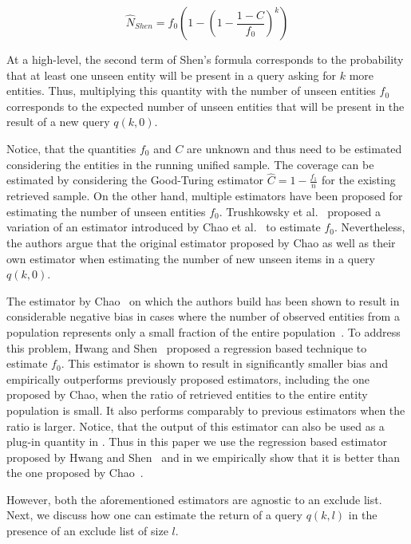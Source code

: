 \documentclass{vldb}
\begin{document}
\begin{equation}
\label{eq:shen}
\hat{N}_{Shen} = f_0\left( 1 - \left(1 - \frac{1 - C}{f_0}\right)^k\right)
\end{equation}

At a high-level, the second term of Shen's formula corresponds to the probability that at least one unseen entity will be present in a query asking for $k$ more entities. Thus, multiplying this quantity with the number of unseen entities $f_0$ corresponds to the expected number of unseen entities that will be present in the result of a new query $q(k,0)$.

Notice, that the quantities $f_0$ and $C$ are unknown and thus need to be estimated considering the entities in the running unified sample. The coverage can be estimated by considering the Good-Turing estimator $\hat{C} = 1 - \frac{f_1}{n}$ for the existing retrieved sample. On the other hand, multiple estimators have been proposed for estimating the number of unseen entities $f_0$. Trushkowsky et al.~\cite{trushkowsky:2013} proposed a variation of an estimator introduced by Chao et al.~\cite{chao:1992} to estimate $f_0$. Nevertheless, the authors argue that the original estimator proposed by Chao as well as their own estimator when estimating  the number of new unseen items in a query $q(k,0)$.

The estimator by Chao~\cite{chao:1992} on which the authors build has been shown to result in considerable negative bias in cases where the number of observed entities from a population represents only a small fraction of the entire population~\cite{hwang:2010}. To address this problem, Hwang and Shen~\cite{hwang:2010} proposed a regression based technique to estimate $f_0$. This estimator is shown to result in significantly smaller bias and empirically outperforms previously proposed estimators, including the one proposed by Chao, when the ratio of retrieved entities to the entire entity population is small. It also performs comparably to previous estimators when the ratio is larger. Notice, that the output of this estimator can also be used as a plug-in quantity in . 
Thus in this paper we use the regression based estimator proposed by Hwang and Shen~\cite{hwang:2010} and in  we empirically show that it is better than the one proposed by Chao~\cite{chao:1992}.

However, both the aforementioned estimators are agnostic to an exclude list. Next, we discuss how one can estimate the return of a query $q(k,l)$ in the presence of an exclude list of size $l$.
\end{document}
